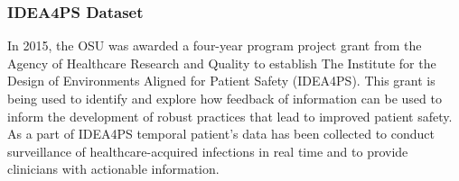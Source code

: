 %

%



\subsubsection{IDEA4PS Dataset}
In 2015, the OSU was awarded a four-year program project grant from the Agency of Healthcare Research and Quality to establish The Institute for the Design of Environments Aligned for Patient Safety (IDEA4PS). This grant is being used to identify and explore how feedback of information can be used to inform the development of robust practices that lead to improved patient safety. As a part of IDEA4PS temporal patient's data has been collected to conduct surveillance of healthcare-acquired infections in real time and to provide clinicians with actionable information.


